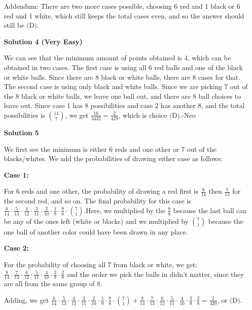 \begin{enumerate}
 Addendum: There are two more cases possible, choosing 6 red and 1 black or 6 red and 1 white, which still keeps the total cases even, and so the answer should still be $\boxed{\text{(D)}}$.

 



\textbf{Solution 4 (Very Easy)}

We can see that the minimum amount of points obtained is 4, which can be obtained in two cases. The first case is using all 6 red balls and one of the black or white balls. Since there are 8 black or white balls, there are 8 cases for that. The second case is using only black and white balls. Since we are picking 7 out of the 8 black or white balls, we leave one ball out, and there are 8 ball choices to leave out. Since case 1 has 8 possibilities and case 2 has another 8, and the total possibilities is $\binom{14}{7}$, we get $\boxed{\frac{16}{3432}=\frac{2}{429}}$, which is choice $\boxed{\text{(D)}}$.-Neo

 



\textbf{Solution 5}

We first see the minimum is either 6 reds and one other or 7 out of the blacks/whites. We add the probabilities of drawing either case as follows:

 \textbf{Case 1:}

 For 6 reds and one other, the probability of drawing a red first is $\frac{6}{14}$ then $\frac{5}{13}$ for the second red, and so on. The final probability for this case is $\frac{6}{14} \cdot \frac{5}{13} \cdot \frac{4}{12} \cdot \frac{3}{11} \cdot \frac{2}{10} \cdot \frac{1}{9} \cdot \frac{8}{8} \cdot \binom{7}{1}$.Here, we multiplied by the $\frac{8}{8}$ because the last ball can be any of the ones left (white or blacks) and we multiplied by $\binom{7}{1}$ because the one ball of another color could have been drawn in any place.

 \textbf{Case 2:}

 For the probability of choosing all 7 from black or white, we get:$\frac{8}{14}\cdot\frac{7}{13}\cdot\frac{6}{12}\cdot\frac{5}{11}\cdot\frac{4}{10}\cdot\frac{3}{9}\cdot\frac{2}{8}$ and the order we pick the balls in didn't matter, since they are all from the same group of 8.

 
Adding, we get $\frac{6}{14} \cdot \frac{5}{13} \cdot \frac{4}{12} \cdot \frac{3}{11} \cdot \frac{2}{10} \cdot \frac{1}{9} \cdot \frac{8}{8} \cdot \binom{7}{1} + \frac{8}{14}\cdot\frac{7}{13}\cdot\frac{6}{12}\cdot\frac{5}{11}\cdot\frac{4}{10}\cdot\frac{3}{9}\cdot\frac{2}{8} = \frac{2}{429}$, or $\boxed{\text{(D)}}$.


\end{enumerate}
